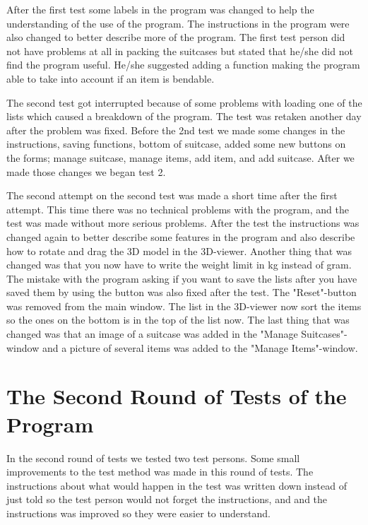 After the first test some labels in the program was changed to help the understanding of the use of the program. The instructions in the program were also changed to better describe more of the program. The first test person did not have problems at all in packing the suitcases but stated that he/she did not find the program useful. He/she suggested adding a function making the program able to take into account if an item is bendable.

The second test got interrupted because of some problems with loading one of the lists which caused a breakdown of the program. The test was retaken another day after the problem was fixed. Before the 2nd test we made some changes in the instructions, saving functions, bottom of suitcase, added some new buttons on the forms; manage suitcase, manage items, add item, and add suitcase. After we made those changes we began test 2.

The second attempt on the second test was made a short time after the first attempt. This time there was no technical problems with the program, and the test was made without more serious problems. After the test the instructions was changed again to better describe some features in the program and also describe how to rotate and drag the 3D model in the 3D-viewer. Another thing that was changed was that you now have to write the weight limit in kg instead of gram. The mistake with the program asking if you want to save the lists after you have saved them by using the button was also fixed after the test. The "Reset"-button  was removed from the main window. The list in the 3D-viewer now sort the items so the ones on the bottom is in the top of the list now. The last thing that was changed was that an image of a suitcase was added in the "Manage Suitcases"-window and a picture of several items was added to the "Manage Items"-window.

\section{The Second Round of Tests of the Program}
In the second round of tests we tested two test persons. Some small improvements to the test method was made in this round of tests. The instructions about what would happen in the test was written down instead of just told so the test person would not forget the instructions, and and the instructions was improved so they were easier to understand.


